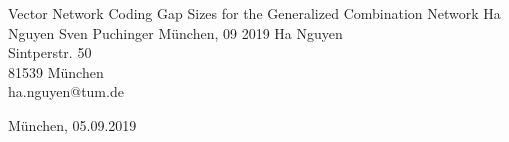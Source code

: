 \documentclass{CODthesis}
\theoremstyle{definition}
\theoremstyle{plain}
\theoremstyle{remark}
\theoremstyle{plain}
\theoremstyle{definition}
\theoremstyle{plain}
\theoremstyle{plain}
\begin{document}
    {Vector Network Coding Gap Sizes for the Generalized Combination Network}                  %
    {Ha Nguyen}                  %
    {Sven Puchinger}            %
    {M\"unchen, 09 2019}          %
    {Ha Nguyen\\                 %
    Sintperstr. 50\\
    81539 M\"unchen\\
    ha.nguyen@tum.de}

    {M\"unchen, 05.09.2019}         %

\cleardoubleemptypage   %


    \setcounter{page}{1}

        \tableofcontents    %
        \listoffigures      %
        \listoftables       %
        \cleardoubleemptypage   %


    \setcounter{page}{1}

	
	
	
	
    
    
    
        
        \cleardoubleemptypage



    \appendix
    \setcounter{page}{1}
       

        
        
\end{document}
